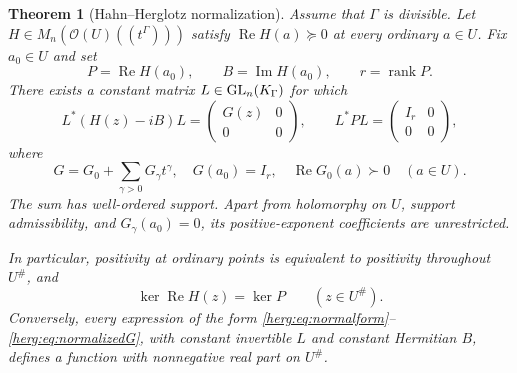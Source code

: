 \documentclass[11pt,letterpaper]{article}
\newtheorem{theorem}{Theorem}[section]
\theoremstyle{definition}
\newcommand{\OU}[1]{\mathcal O(#1)((t^\Gamma))}
\newcommand{\rank}{\operatorname{rank}}
\newcommand{\Rea}{\operatorname{Re}}
\newcommand{\Ima}{\operatorname{Im}}
\newcommand{\halo}[1]{#1^{\#}}
\numberwithin{equation}{section}
\begin{document}
\begin{theorem}[Hahn--Herglotz normalization]\label{herg:thm:normalization}
Assume that $\Gamma$ is divisible. Let $H\in M_n(\OU{U})$ satisfy $\Rea H(a)\succeq0$ at every ordinary $a\in U$. Fix $a_0\in U$ and set
\[
 P=\Rea H(a_0),\qquad B=\Ima H(a_0),\qquad r=\rank P.
\]
There exists a constant matrix $L\in\mathrm{GL}_n(K_\Gamma)$ for which
\begin{equation}\label{herg:eq:normalform}
 L^*(H(z)-iB)L=
 \begin{pmatrix}G(z)&0\\0&0\end{pmatrix},
 \qquad L^*PL=\begin{pmatrix}I_r&0\\0&0\end{pmatrix},
\end{equation}
where
\begin{equation}\label{herg:eq:normalizedG}
 G=G_0+\sum_{\gamma>0}G_\gamma t^\gamma,
 \quad G(a_0)=I_r,
 \quad \Rea G_0(a)\succ0\quad(a\in U).
\end{equation}
The sum has well-ordered support. Apart from holomorphy on $U$, support admissibility, and $G_\gamma(a_0)=0$, its positive-exponent coefficients are unrestricted.

In particular, positivity at ordinary points is equivalent to positivity throughout $\halo U$, and
\begin{equation}\label{herg:eq:commonkernel}
 \ker\Rea H(z)=\ker P\qquad(z\in\halo U).
\end{equation}
Conversely, every expression of the form \eqref{herg:eq:normalform}--\eqref{herg:eq:normalizedG}, with constant invertible $L$ and constant Hermitian $B$, defines a function with nonnegative real part on $\halo U$.
\end{theorem}
\end{document}
